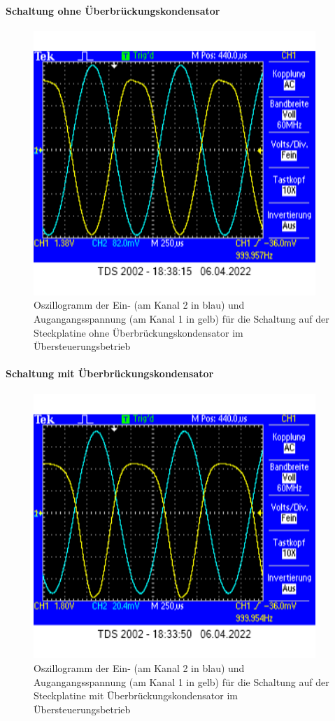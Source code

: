 \documentclass[12pt,english,ngerman]{scrartcl}
\begin{document}
\paragraph{Schaltung ohne Überbrückungskondensator}
\begin{figure}[H]
  \centering
    \includegraphics[width=\linewidth, height=10cm]{./figures/messungen/ohneuebergrenze.png}
  \caption{Oszillogramm der Ein- (am Kanal 2 in blau) und Augangangsspannung (am Kanal 1 in gelb) für die Schaltung auf der Steckplatine ohne Überbrückungskondensator im Übersteuerungsbetrieb}
  \label{fig:oszi_ohne_uebersteuerung}
\end{figure}


\paragraph{Schaltung mit Überbrückungskondensator}

\begin{figure}[H]
  \centering
    \includegraphics[width=\linewidth, height=10cm]{./figures/messungen/mituebergrenze.png}
  \caption{Oszillogramm der Ein- (am Kanal 2 in blau) und Augangangsspannung (am Kanal 1 in gelb) für die Schaltung auf der Steckplatine mit Überbrückungskondensator im Übersteuerungsbetrieb}
  \label{fig:oszi_mit_uerbersteuerung}
\end{figure}
\end{document}
